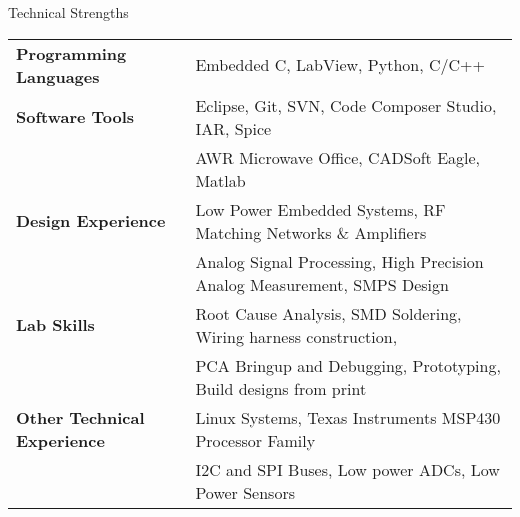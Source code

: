 \documentclass{resume} %
\begin{document}
\begin{rSection}{Technical Strengths}

\begin{tabular}{ @{} >{\bfseries}l @{\hspace{6ex}} l }
Programming Languages & Embedded C, LabView, Python, C/C++  \smallskip \\

Software Tools & Eclipse, Git, SVN, Code Composer Studio, IAR, Spice\\ 
 & AWR Microwave Office, CADSoft Eagle, Matlab \smallskip \\

Design Experience & Low Power Embedded Systems, RF Matching Networks \& Amplifiers\\
 & Analog Signal Processing, High Precision Analog Measurement, SMPS Design \smallskip \\
 
Lab Skills & Root Cause Analysis, SMD Soldering, Wiring harness construction,\\
& PCA Bringup and Debugging, Prototyping, Build designs from print\smallskip \\
 
Other Technical Experience & Linux Systems, Texas Instruments MSP430 Processor Family \\
& I2C and SPI Buses, Low power ADCs, Low Power Sensors\\
\end{tabular}

\end{rSection}
\medskip

\end{document}
